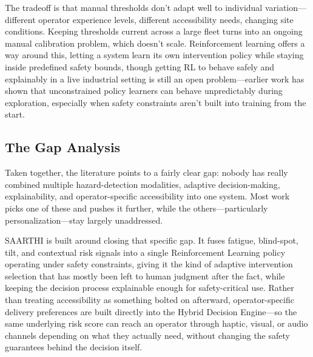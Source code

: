 The tradeoff is that manual thresholds don't adapt well to individual variation---different operator experience levels, different accessibility needs, changing site conditions. Keeping thresholds current across a large fleet turns into an ongoing manual calibration problem, which doesn't scale. Reinforcement learning offers a way around this, letting a system learn its own intervention policy while staying inside predefined safety bounds, though getting RL to behave safely and explainably in a live industrial setting is still an open problem---earlier work has shown that unconstrained policy learners can behave unpredictably during exploration, especially when safety constraints aren't built into training from the start.

\subsection{The Gap Analysis}
Taken together, the literature points to a fairly clear gap: nobody has really combined multiple hazard-detection modalities, adaptive decision-making, explainability, and operator-specific accessibility into one system. Most work picks one of these and pushes it further, while the others---particularly personalization---stay largely unaddressed.

SAARTHI is built around closing that specific gap. It fuses fatigue, blind-spot, tilt, and contextual risk signals into a single Reinforcement Learning policy operating under safety constraints, giving it the kind of adaptive intervention selection that has mostly been left to human judgment after the fact, while keeping the decision process explainable enough for safety-critical use. Rather than treating accessibility as something bolted on afterward, operator-specific delivery preferences are built directly into the Hybrid Decision Engine---so the same underlying risk score can reach an operator through haptic, visual, or audio channels depending on what they actually need, without changing the safety guarantees behind the decision itself.